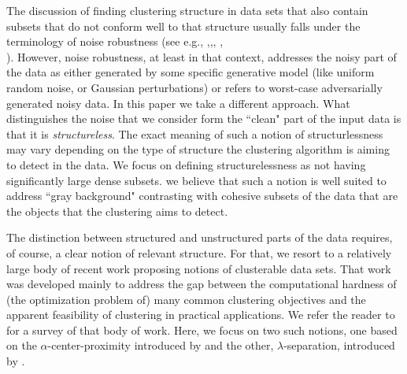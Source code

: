\documentclass[orivec]{llncs}
\begin{document}
The discussion of finding clustering structure in data sets that also contain subsets that do not conform well to that structure usually falls under the terminology of noise robustness (see e.g., \cite{balcan2012clustering},\cite{ackerman2009clusterability},\cite{dave1993robust}, \cite{cuesta1997trimmed},\\\cite{garcia2008general}). However, noise robustness, at least in that context, addresses the noisy part of the data as either generated by some specific generative model (like uniform random noise, or Gaussian perturbations) or refers to worst-case adversarially generated noisy data. In this paper we take a different approach. What distinguishes the noise that we consider form the ``clean" part of the input data is that it is \emph{structureless}. The exact meaning of such a notion of structurlessness may vary depending on the type of structure the clustering algorithm is aiming to detect in the data. We focus on defining structurelessness as  not having significantly large dense subsets. we believe that such a notion is well suited to address ``gray background" contrasting with cohesive subsets of the data that are the objects that the clustering aims to detect. 

The distinction between structured and unstructured parts of the data requires, of course, a clear notion of relevant structure. For that, we resort to a relatively large body of recent work proposing notions of clusterable data sets. That work was developed mainly to address the gap between the computational hardness of (the optimization problem of) many common clustering objectives and the apparent feasibility of clustering in practical applications. We refer the reader to \cite{ben2015computational} for a survey of that body of work. Here, we focus on two such notions, one based on the $\alpha$-center-proximity introduced by \cite{awasthi2012center} and the other, $\lambda$-separation, introduced by \cite{ben2014clustering}.
\end{document}
